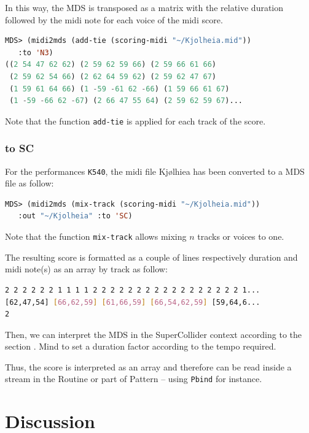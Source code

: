 \smallskip

In this way, the MDS is transposed as a matrix with the relative duration followed by the midi note for each voice of the midi score. 

\begin{lstlisting}[language=Lisp]
MDS> (midi2mds (add-tie (scoring-midi "~/Kjolheia.mid")) 
   :to 'N3)
((2 54 47 62 62) (2 59 62 59 66) (2 59 66 61 66) 
 (2 59 62 54 66) (2 62 64 59 62) (2 59 62 47 67) 
 (1 59 61 64 66) (1 -59 -61 62 -66) (1 59 66 61 67) 
 (1 -59 -66 62 -67) (2 66 47 55 64) (2 59 62 59 67)...
\end{lstlisting}

Note that the function \texttt{add-tie} is applied for each track of the score.


\subsubsection{to SC}

For the performances \texttt{K540}, the midi file Kj{\o}lhiea has been converted to a MDS file as follow:
\begin{lstlisting}[language=Lisp]
MDS> (midi2mds (mix-track (scoring-midi "~/Kjolheia.mid")) 
   :out "~/Kjolheia" :to 'SC)
\end{lstlisting}

Note that the function \texttt{mix-track} allows mixing $n$ tracks or voices to one.
\newpage

The resulting score is formatted as a couple of lines respectively duration and midi note(s) as an array by track as follow:

\begin{lstlisting}[language=bash]
2 2 2 2 2 2 1 1 1 1 2 2 2 2 2 2 2 2 2 2 2 2 2 2 2 2 2 1...
[62,47,54] [66,62,59] [61,66,59] [66,54,62,59] [59,64,6...
2
\end{lstlisting}

\smallskip

Then, we can interpret the MDS in the SuperCollider context according to the section . Mind to set a duration factor according to the tempo required.

\smallskip

Thus, the score is interpreted as an array and therefore can be read inside a stream in the Routine or part of Pattern -- using \texttt{Pbind} for instance.


\section{Discussion}

